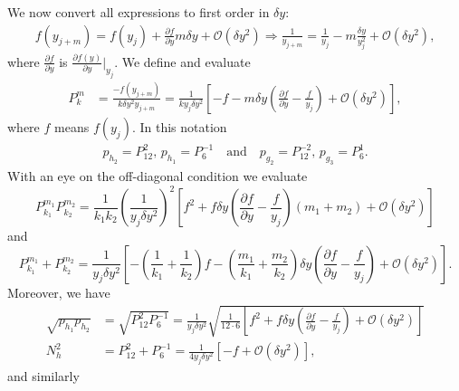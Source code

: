 \documentclass{theoretics}
\begin{document}
We now convert all expressions to first
order in $\delta y$:
\begin{align*}
  f(y_{j+m}) =f(y_{j})+\frac{\partial f}{\partial y}m\delta y+\mathcal{O}(\delta y^{2})\Rightarrow
  \frac{1}{y_{j+m}} =\frac{1}{y_{j}}-m\frac{\delta y}{y_{j}^{2}}+\mathcal{O}(\delta y^{2}),
\end{align*}
where $\frac{\partial f}{\partial y}$ is $\frac{\partial f(y)}{\partial y}|_{y_{j}}$.
We define and evaluate
\begin{align*}
  P_{k}^{m} & =\frac{-f(y_{j+m})}{k\delta y^{2}y_{j+m}} =\frac{1}{ky_{j}\delta y^{2}}\left[-f-m\delta y\left(\frac{\partial f}{\partial y}-\frac{f}{y_{j}}\right)+\mathcal{O}(\delta y^{2})\right],
\end{align*}
where $f$ means $f(y_{j})$. In this notation
\begin{align*}
  p_{h_{2}} =P_{12}^{2},\,p_{h_{1}}=P_{6}^{-1}\ \ \ \text{ and }\ \ \
  p_{g_{2}}  =P_{12}^{-2},\,p_{g_{3}}=P_{6}^{1}.
\end{align*}
With an eye on the off-diagonal condition we evaluate
\begin{displaymath}
  P_{k_{1}}^{m_{1}}P_{k_{2}}^{m_{2}}=\frac{1}{k_{1}k_{2}}\left(\frac{1}{y_{j}\delta y^{2}}\right)^{2}\left[f^{2}+f\delta y\left(\frac{\partial f}{\partial y}-\frac{f}{y_{j}}\right)\left(m_{1}+m_{2}\right)+\mathcal{O}(\delta y^{2})\right]
\end{displaymath}
and
\begin{displaymath}
  P_{k_{1}}^{m_{1}}+P_{k_{2}}^{m_{2}}=\frac{1}{y_{j}\delta y^{2}}\left[-\left(\frac{1}{k_{1}}+\frac{1}{k_{2}}\right)f-\left(\frac{m_{1}}{k_{1}}+\frac{m_{2}}{k_{2}}\right)\delta y\left(\frac{\partial f}{\partial y}-\frac{f}{y_{j}}\right)+\mathcal{O}(\delta y^{2})\right].
\end{displaymath}
Moreover, we have
\begin{align*}
  \sqrt{p_{h_{1}}p_{h_{2}}} & =\sqrt{P_{12}^{2}P_{6}^{-1}}=\frac{1}{y_{j}\delta y^{2}}\sqrt{\frac{1}{12\cdot 6}\left[f^{2}+f\delta y\left(\frac{\partial f}{\partial y}-\frac{f}{y_{j}}\right)+\mathcal{O}(\delta y^{2})\right]} \\
  N_{h}^{2}                 & =P_{12}^{2}+P_{6}^{-1}=\frac{1}{4y_{j}\delta y^{2}}\left[-f+\mathcal{O}(\delta y^{2})\right],
\end{align*}
and similarly
\end{document}
